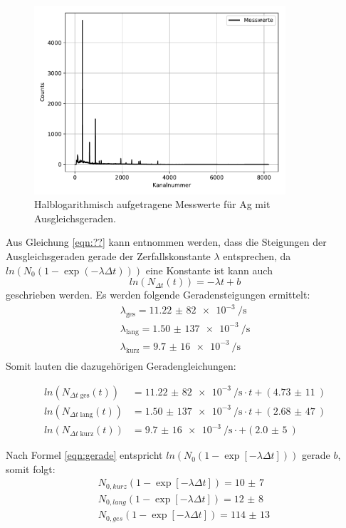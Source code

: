 \begin{figure}[H]
  \centering
  \includegraphics[height=7cm]{plot1.pdf}
  \caption{Halblogarithmisch aufgetragene Messwerte für Ag mit Ausgleichsgeraden.}
  \label{fig:plot1}
\end{figure}

Aus Gleichung \ref{eqn:??} kann entnommen werden, dass die Steigungen der Ausgleichsgeraden
gerade der Zerfallskonstante $\lambda$ entsprechen, da $ln(N_0(1-\exp{(-\lambda\Delta t)}))$
eine Konstante ist kann auch
\begin{equation}
  ln(N_{\Delta t}(t))= -\lambda t +b
  \label{eqn:gerade}
\end{equation}
geschrieben werden.
Es werden folgende Geradensteigungen ermittelt:
\begin{align*}
  \lambda_{\text{ges}}=\SI{11,22(82)e-3}{\per\s}\\
  \lambda_{\text{lang}}=\SI{1,50(137)e-3}{\per\s}\\
  \lambda_{\text{kurz}}=\SI{9,7(16)e-3}{\per\s}\\
\end{align*}
Somit lauten die dazugehörigen Geradengleichungen:

\begin{align*}
  ln(N_{\Delta t\;\text{ges}}(t))&=\SI{11,22(82)e-3}{\per\s}\cdot t+(\SI{4,73(11)}{})\\
  ln(N_{\Delta t\;\text{lang}}(t))&=\SI{1,50(137)e-3}{\per\s}\cdot t +(\SI{2,68(47)}{})\\
  ln(N_{\Delta t\;\text{kurz}}(t))&=\SI{9,7(16)e-3}{\per\s}\cdot + (\SI{2,0(5)}{})
\end{align*}

Nach Formel \ref{eqn:gerade} entspricht $ln(N_0(1-\exp{[-\lambda\Delta t]}))$ gerade $b$, somit folgt:
\begin{align*}
  N_{0,kurz}(1-\exp{[-\lambda\Delta t]})=\SI{10(7)}{}\\
  N_{0,lang}(1-\exp{[-\lambda\Delta t]})=\SI{12(8)}{}\\
  N_{0,ges}(1-\exp{[-\lambda\Delta t]})=\SI{114(13)}{}\\
\end{align*}

